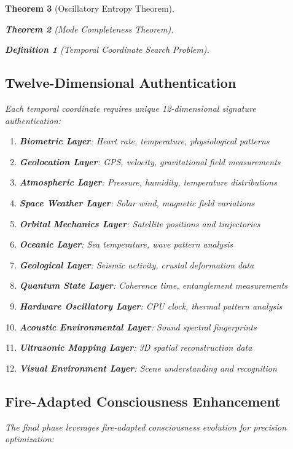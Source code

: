 \documentclass[12pt,a4paper]{article}
\newtheorem{theorem}{Theorem}[section]
\newtheorem{definition}[theorem]{Definition}
\begin{document}
\begin{theorem}[Oscillatory Entropy Theorem]
\begin{theorem}[Mode Completeness Theorem]
\begin{enumerate}
\begin{definition}[Temporal Coordinate Search Problem]
\begin{algorithm}
\subsection{Twelve-Dimensional Authentication}

Each temporal coordinate requires unique 12-dimensional signature authentication:

\begin{enumerate}
\item \textbf{Biometric Layer}: Heart rate, temperature, physiological patterns
\item \textbf{Geolocation Layer}: GPS, velocity, gravitational field measurements
\item \textbf{Atmospheric Layer}: Pressure, humidity, temperature distributions
\item \textbf{Space Weather Layer}: Solar wind, magnetic field variations
\item \textbf{Orbital Mechanics Layer}: Satellite positions and trajectories
\item \textbf{Oceanic Layer}: Sea temperature, wave pattern analysis
\item \textbf{Geological Layer}: Seismic activity, crustal deformation data
\item \textbf{Quantum State Layer}: Coherence time, entanglement measurements
\item \textbf{Hardware Oscillatory Layer}: CPU clock, thermal pattern analysis
\item \textbf{Acoustic Environmental Layer}: Sound spectral fingerprints
\item \textbf{Ultrasonic Mapping Layer}: 3D spatial reconstruction data
\item \textbf{Visual Environment Layer}: Scene understanding and recognition
\end{enumerate}

\subsection{Fire-Adapted Consciousness Enhancement}

The final phase leverages fire-adapted consciousness evolution for precision optimization:


\end{algorithm}
\end{definition}
\end{enumerate}
\end{theorem}
\end{theorem}
\end{document}

